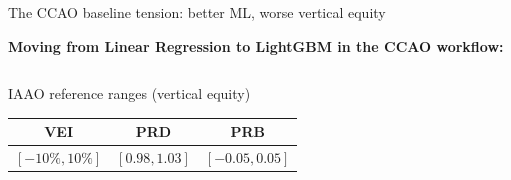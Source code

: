 \documentclass[aspectratio=169,12pt,]{beamer}
\newcommand{\1}{\mathbf{1}}
\begin{document}
\begin{frame}{The CCAO baseline tension: better ML, worse vertical equity}

\textbf{Moving from Linear Regression to LightGBM in the CCAO workflow:}

\vspace{2mm}

\begin{table}[]
\centering
{}
\vspace{-1mm}
\caption{\footnotesize Held-out 2023 CCAO test set. \textcolor{green!60!black}{\textbf{Green}}: accuracy / horizontal equity improve. \textcolor{red}{\textbf{Red}}: vertical equity worsens.}
\end{table}

\vspace{-2mm}

\begin{columns}[T,onlytextwidth]
\begin{block}{ IAAO reference ranges (vertical equity)}
\centering\small
\begin{tabular}{ccc}
\toprule
VEI & PRD & PRB \\
\midrule
$[-10\%, 10\%]$ & $[0.98, 1.03]$ & $[-0.05, 0.05]$ \\
\bottomrule
\end{tabular}
\end{block}


\end{columns}
\end{frame}
\end{document}
